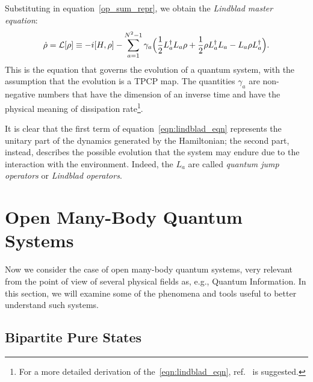 Substituting in equation~\ref{op_sum_repr}, we obtain the \emph{Lindblad master equation}:
\begin{equation}
\label{eqn:lindblad_eqn}
    \dot{\rho} = \mathcal{L}[\rho] \equiv -i[H, \rho] - \sum_{a=1}^{N^2-1} \gamma_a \Bigl(\frac{1}{2}L_a^{\dagger}L_a\rho + \frac{1}{2}\rho L_a^{\dagger}L_a - L_a\rho L_a^{\dagger}\Bigl).
\end{equation}
This is the equation that governs the evolution of a quantum system, with the assumption that the evolution is a TPCP map. The quantities $\gamma_a$ are non-negative numbers that have the dimension of an inverse time and have the physical meaning of dissipation rate\footnote{For a more detailed derivation of the~\ref{eqn:lindblad_eqn}, ref.~\cite{pet_breuer:open_quantum} is suggested.}.

It is clear that the first term of equation~\ref{eqn:lindblad_eqn} represents the unitary part of the dynamics generated by the Hamiltonian; the second part, instead, describes the possible evolution that the system may endure due to the interaction with the environment. Indeed, the $L_a$ are called \emph{quantum jump operators} or \emph{Lindblad operators}.



\section{Open Many-Body Quantum Systems}
\label{many_body_oqs}
Now we consider the case of open many-body quantum systems, very relevant from the point of view of several physical fields as, e.g., Quantum Information. In this section, we will examine some of the phenomena and tools useful to better understand such systems. 

\subsection{Bipartite Pure States}

